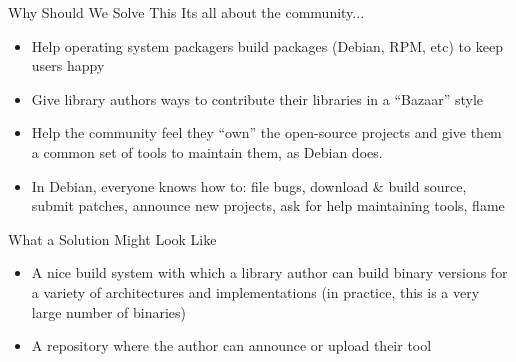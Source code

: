 \documentclass[pdf,rico,slideColor,colorBG]{prosper}
\begin{document}
\begin{slide}{Why Should We Solve This}
Its all about the community...
\begin{itemize}
  \item Help operating system packagers build packages (Debian, RPM,
  etc) to keep users happy
  \item Give library authors ways to contribute their libraries in a ``Bazaar'' style
  \item Help the community feel they ``own'' the open-source projects and give them a common set of tools to maintain them, as Debian does.
  \item In Debian, everyone knows how to: file bugs, download \& build source, submit patches, announce new projects, ask for help maintaining tools, flame
\end{itemize}
\end{slide}


\begin{slide}{What a Solution Might Look Like}
\begin{itemize}

  \item A nice build system with which a library author can build binary versions for a variety of architectures and implementations (in practice, this is a very large number of binaries)
  \item A repository where the author can announce or upload their tool
\end{itemize}
\end{slide}
\end{document}
